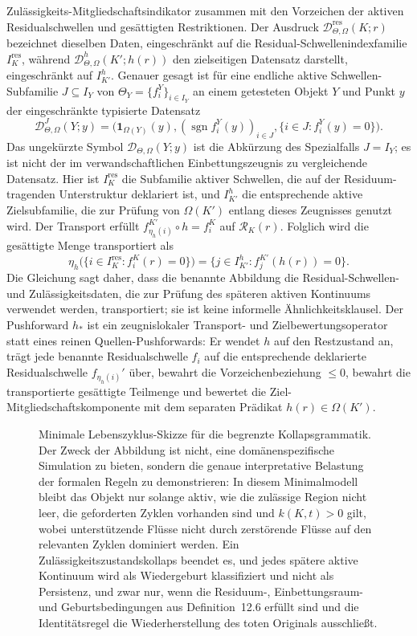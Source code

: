 Zulässigkeits-Mitgliedschaftsindikator zusammen mit den Vorzeichen der aktiven Residualschwellen und
gesättigten Restriktionen. Der Ausdruck
\(\mathcal{D}^{\mathrm{res}}_{\Theta,\Omega}(K;r)\) bezeichnet dieselben Daten, eingeschränkt auf die
Residual-Schwellenindexfamilie \(I_K^{\mathrm{res}}\), während
\(\mathcal{D}^{h}_{\Theta,\Omega}(K';h(r))\) den zielseitigen Datensatz darstellt, eingeschränkt auf
\(I_{K'}^{h}\). Genauer gesagt ist für eine endliche aktive Schwellen-Subfamilie
\(J\subseteq I_Y\) von
\(\Theta_Y=\{f_i^Y\}_{i\in I_Y}\) an einem getesteten Objekt \(Y\) und Punkt \(y\) der eingeschränkte
typisierte Datensatz
\[
  \mathcal{D}^{J}_{\Theta,\Omega}(Y;y)=
  \big(
    \mathbf{1}_{\Omega(Y)}(y),
    (\operatorname{sgn} f_i^Y(y))_{i\in J},
    \{i\in J:f_i^Y(y)=0\}
  \big).
\]
Das ungekürzte Symbol \(\mathcal{D}_{\Theta,\Omega}(Y;y)\) ist die Abkürzung des Spezialfalls
\(J=I_Y\); es ist nicht der im verwandschaftlichen Einbettungszeugnis zu vergleichende Datensatz.
Hier ist \(I_K^{\mathrm{res}}\) die Subfamilie aktiver Schwellen, die auf der Residuum-tragenden
Unterstruktur deklariert ist, und \(I_{K'}^{h}\) die entsprechende aktive Zielsubfamilie, die zur Prüfung von
\(\Omega(K')\) entlang dieses Zeugnisses genutzt wird. Der Transport erfüllt
\(f_{\eta_h(i)}^{K'}\circ h=f_i^K\) auf \(\mathcal{R}_K(r)\).
Folglich wird die gesättigte Menge transportiert als
\[
  \eta_h\bigl(\{i\in I_K^{\mathrm{res}}:f_i^K(r)=0\}\bigr)
  =
  \{j\in I_{K'}^{h}:f_j^{K'}(h(r))=0\}.
\]
Die Gleichung sagt daher, dass die benannte Abbildung die Residual-Schwellen- und Zulässigkeitsdaten,
die zur Prüfung des späteren aktiven Kontinuums verwendet werden, transportiert; sie ist keine informelle
Ähnlichkeitsklausel. Der Pushforward \(h_{\ast}\) ist ein zeugnislokaler Transport- und Zielbewertungsoperator
statt eines reinen Quellen-Pushforwards: Er wendet \(h\) auf den Restzustand an, trägt jede benannte
Residualschwelle \(f_i\) auf die entsprechende deklarierte Residualschwelle \(f_{\eta_h(i)}'\) über, bewahrt
die Vorzeichenbeziehung \(\le 0\), bewahrt die transportierte gesättigte Teilmenge und bewertet die
Ziel-Mitgliedschaftskomponente mit dem separaten Prädikat
\(h(r)\in\Omega(K')\).

\begin{figure}[htbp]
\centering

\caption{Minimale Lebenszyklus-Skizze für die begrenzte Kollapsgrammatik. Der Zweck der Abbildung ist nicht,
eine domänenspezifische Simulation zu bieten, sondern die genaue interpretative Belastung der formalen Regeln zu
demonstrieren: In diesem Minimalmodell bleibt das Objekt nur solange aktiv, wie die zulässige Region nicht leer,
die geforderten Zyklen vorhanden sind und \(k(K,t)>0\) gilt, wobei unterstützende Flüsse nicht durch
zerstörende Flüsse auf den relevanten Zyklen dominiert werden. Ein Zulässigkeitszustandskollaps beendet es,
und jedes spätere aktive Kontinuum wird als Wiedergeburt klassifiziert und nicht als Persistenz, und zwar nur,
wenn die Residuum-, Einbettungsraum- und Geburtsbedingungen aus Definition~12.6 erfüllt sind und die
Identitätsregel die Wiederherstellung des toten Originals ausschließt.}
\label{fig:oc13-birth-life-death}
\end{figure}


